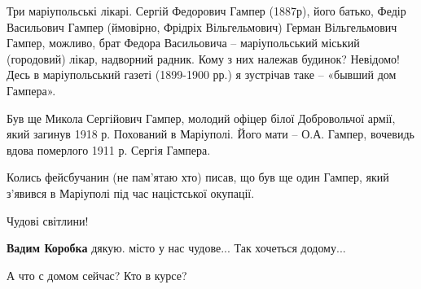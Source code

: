  
 
 
 
 

\qqSecCmt


Три маріупольські лікарі. Сергій Федорович Гампер (1887р), його батько, Федір
Васильович Гампер (ймовірно, Фрідріх Вільгельмович) Герман Вільгельмович
Гампер, можливо, брат Федора Васильовича – маріупольський міський (городовий)
лікар, надворний радник. Кому з них належав будинок? Невідомо! Десь в
маріупольський газеті (1899-1900 рр.) я зустрічав таке – «бывший дом Гампера».

Був ще Микола Сергійович Гампер, молодий офіцер білої Добровольчої армії, який
загинув 1918 р. Похований в Маріуполі. Його мати – О.А. Гампер, вочевидь вдова
померлого 1911 р. Сергія Гампера.

Колись фейсбучанин (не пам'ятаю хто) писав, що був ще один Гампер, який
з'явився в Маріуполі під час націстської окупації.


Чудові світлини!

\begin{itemize} %
\textbf{Вадим Коробка} дякую. місто у нас чудове... Так хочеться додому...
\end{itemize} %


А что с домом сейчас? Кто в курсе?

